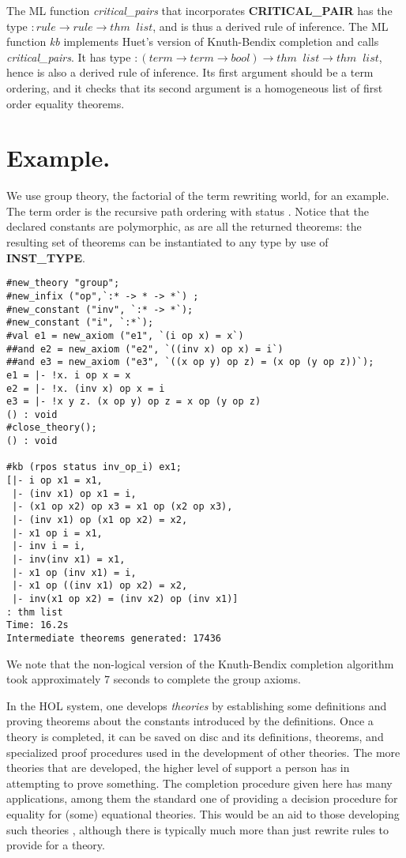 The ML function {\em critical\_pairs} that incorporates {\bf CRITICAL\_PAIR}
has the type $:rule \rightarrow rule \rightarrow thm \;\; list$, and is thus a
derived rule of inference. The ML function {\em kb} implements Huet's version
of Knuth-Bendix completion \cite{huet81} and calls {\em critical\_pairs}. It
has type $:(term \rightarrow term \rightarrow bool) \rightarrow thm \;\; list
\rightarrow thm \;\; list$, hence is also a derived rule of inference. Its
first argument should be a term ordering, and it checks that its second
argument is a homogeneous list of first order equality theorems.


\section{Example.}

We use group theory, the factorial of the term rewriting world, for an example.
The term order is the recursive path ordering with status \cite{dersh87}.
Notice that the declared constants are polymorphic, as are all the returned
theorems: the resulting set of theorems can be instantiated to any type by use
of {\bf INST\_TYPE}.

\begin{verbatim}
#new_theory "group";
#new_infix ("op",`:* -> * -> *`) ;
#new_constant ("inv", `:* -> *`);
#new_constant ("i", `:*`);
#val e1 = new_axiom ("e1", `(i op x) = x`)
##and e2 = new_axiom ("e2", `((inv x) op x) = i`)
##and e3 = new_axiom ("e3", `((x op y) op z) = (x op (y op z))`);
e1 = |- !x. i op x = x
e2 = |- !x. (inv x) op x = i
e3 = |- !x y z. (x op y) op z = x op (y op z)
() : void
#close_theory();
() : void

#kb (rpos status inv_op_i) ex1;
[|- i op x1 = x1,
 |- (inv x1) op x1 = i,
 |- (x1 op x2) op x3 = x1 op (x2 op x3),
 |- (inv x1) op (x1 op x2) = x2,
 |- x1 op i = x1,
 |- inv i = i,
 |- inv(inv x1) = x1,
 |- x1 op (inv x1) = i,
 |- x1 op ((inv x1) op x2) = x2,
 |- inv(x1 op x2) = (inv x2) op (inv x1)]
: thm list
Time: 16.2s
Intermediate theorems generated: 17436
\end{verbatim}

We note that the non-logical version of the Knuth-Bendix completion algorithm
took approximately 7 seconds to complete the group axioms.

In the HOL system, one develops {\em theories} by establishing some definitions
and proving theorems about the constants introduced by the definitions. Once a
theory is completed, it can be saved on disc and its definitions, theorems, and
specialized proof procedures used in the development of other theories. The
more theories that are developed, the higher level of support a person has in
attempting to prove something. The completion procedure given here has many
applications, among them the standard one of providing a decision procedure for
equality for (some) equational theories. This would be an aid to those
developing such theories \cite{gunter89}, although there is typically much more
than just rewrite rules to provide for a theory.

